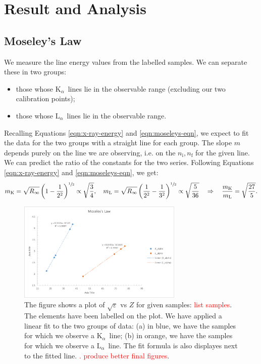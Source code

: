 \documentclass[11pt,a4paper,twoside,onecolumn]{article}
\newcommand{\reminder}[1]{\textcolor{red}{#1}}
\newcommand{\rydberg}{R}
\newcommand{\Kalpha}{$\mathrm{K}_\alpha$~}
\newcommand{\Lalpha}{$\mathrm{L}_\alpha$~}
\begin{document}
\section{Result and Analysis}

\subsection{Moseley's Law}
We measure the line energy values from the labelled samples. We can separate these in two groups:
\begin{itemize}[noitemsep]
    \item those whose \Kalpha lines lie in the observable range (excluding our two calibration points);
    \item those whose \Lalpha lines lie in the observable range.
\end{itemize}
Recalling Equations \eqref{eqn:x-ray-energy} and \eqref{eqn:moseleys-eqn}, we expect to fit the data for the two groups with a straight line for each group. The slope $m$ depends purely on the line we are observing, i.e. on the $n_\mathrm{i}, n_\mathrm{f}$ for the given line. We can predict the ratio of the constants for the two series. Following Equations \eqref{eqn:x-ray-energy} and \eqref{eqn:moseleys-eqn}, we get:
\begin{equation}
    m_\mathrm{K} = \sqrt{\rydberg_\infty} \left(1 - \frac{1}{2^2}\right)^{\sfrac{1}{2}} \propto \sqrt{\frac{3}{4}},\quad m_\mathrm{L} = \sqrt{\rydberg_\infty} \left(\frac{1}{2^2} - \frac{1}{3^2}\right)^{\sfrac{1}{2}} \propto \sqrt{\frac{5}{36}} \quad \Rightarrow \quad \frac{m_\mathrm{K}}{m_\mathrm{L}} = \sqrt{\frac{27}{5}}.
\end{equation}

\begin{figure}[!htbp]
    \centering
    \includegraphics[width=0.7\textwidth]{img/moseleys.png}
    \caption{The figure shows a plot of $\sqrt{\varepsilon}$ vs $Z$ for given samples: \reminder{list samples}. The elements have been labelled on the plot. We have applied a linear fit to the two groups of data: (a) in blue, we have the samples for which we observe a \Kalpha line; (b) in orange, we have the samples for which we observe a \Lalpha line. The fit formula is also displayes next to the fitted line. \reminder{. produce better final figures}.}\label{fig:moseleys}
\end{figure}
\end{document}
